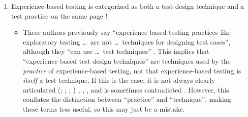 \begin{enumerate}
    \item Experience-based testing is categorized as both a test design
          technique and a test practice on the same page
          \citep[pp.~22, 34]{IEEE2022}!
          \ifnotpaper
              \begin{itemize}
                  \item These authors previously say ``experience-based testing
                        practices like exploratory testing \dots\ are not
                        \dots\ techniques for designing test cases'', although
                        they ``can use \dots\ test techniques''
                        \citeyearpar[p.~viii]{IEEE2021}. This implies that
                        ``experience-based test design techniques'' are
                        techniques used by the \emph{practice} of experience-based
                        testing, not that experience-based testing is
                        \emph{itself} a test technique. If this is the case, it
                        is not always clearly articulated
                        \ifnotpaper
                            (\citealp[pp.~4,~22]{IEEE2022}; \citeyear[p.~4]{IEEE2021};
                            \citealp[p.~5-13]{SWEBOK2024}; \citealpISTQB{})
                        \else
                            \cite[pp.~4,~22]{IEEE2022}, \cite[p.~4]{IEEE2021},
                            \cite[p.~5-13]{SWEBOK2024}, \cite{ISTQB}
                        \fi
                        and is
                        sometimes contradicted \citep[p.~46]{Firesmith2015}.
                        However, this conflates the distinction between
                        ``practice'' and ``technique'', making these terms less
                        useful, so this may just be a mistake.



\end{itemize}
\end{enumerate}
